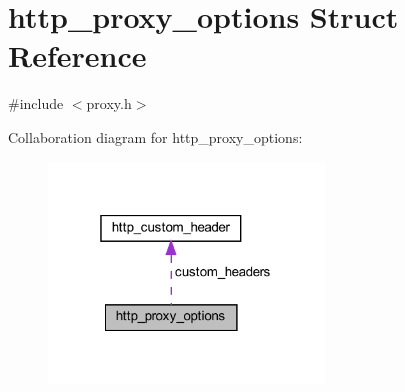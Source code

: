 \hypertarget{structhttp__proxy__options}{}\section{http\+\_\+proxy\+\_\+options Struct Reference}
\label{structhttp__proxy__options}


{\ttfamily \#include $<$proxy.\+h$>$}



Collaboration diagram for http\+\_\+proxy\+\_\+options\+:
\nopagebreak
\begin{figure}[H]
\begin{center}
\leavevmode
\includegraphics[width=208pt]{structhttp__proxy__options__coll__graph}
\end{center}
\end{figure}
